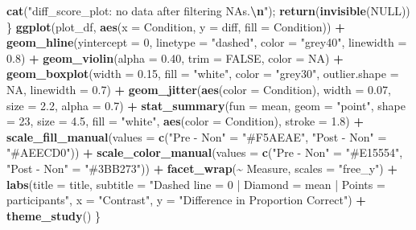 \documentclass[
]{article}
\newenvironment{Shaded}{\begin{snugshade}}{\end{snugshade}}
\newcommand{\AttributeTok}[1]{\textcolor[rgb]{0.13,0.29,0.53}{#1}}
\newcommand{\ConstantTok}[1]{\textcolor[rgb]{0.56,0.35,0.01}{#1}}
\newcommand{\DecValTok}[1]{\textcolor[rgb]{0.00,0.00,0.81}{#1}}
\newcommand{\FloatTok}[1]{\textcolor[rgb]{0.00,0.00,0.81}{#1}}
\newcommand{\FunctionTok}[1]{\textcolor[rgb]{0.13,0.29,0.53}{\textbf{#1}}}
\newcommand{\NormalTok}[1]{#1}
\newcommand{\OtherTok}[1]{\textcolor[rgb]{0.56,0.35,0.01}{#1}}
\newcommand{\SpecialCharTok}[1]{\textcolor[rgb]{0.81,0.36,0.00}{\textbf{#1}}}
\newcommand{\StringTok}[1]{\textcolor[rgb]{0.31,0.60,0.02}{#1}}
\begin{document}
\begin{Shaded}
\begin{Highlighting}[]
    \FunctionTok{cat}\NormalTok{(}\StringTok{"diff\_score\_plot: no data after filtering NAs.}\SpecialCharTok{\textbackslash{}n}\StringTok{"}\NormalTok{); }\FunctionTok{return}\NormalTok{(}\FunctionTok{invisible}\NormalTok{(}\ConstantTok{NULL}\NormalTok{))}
\NormalTok{  \}}
  \FunctionTok{ggplot}\NormalTok{(plot\_df, }\FunctionTok{aes}\NormalTok{(}\AttributeTok{x =}\NormalTok{ Condition, }\AttributeTok{y =}\NormalTok{ diff, }\AttributeTok{fill =}\NormalTok{ Condition)) }\SpecialCharTok{+}
    \FunctionTok{geom\_hline}\NormalTok{(}\AttributeTok{yintercept =} \DecValTok{0}\NormalTok{, }\AttributeTok{linetype =} \StringTok{"dashed"}\NormalTok{, }\AttributeTok{color =} \StringTok{"grey40"}\NormalTok{, }\AttributeTok{linewidth =} \FloatTok{0.8}\NormalTok{) }\SpecialCharTok{+}
    \FunctionTok{geom\_violin}\NormalTok{(}\AttributeTok{alpha =} \FloatTok{0.40}\NormalTok{, }\AttributeTok{trim =} \ConstantTok{FALSE}\NormalTok{, }\AttributeTok{color =} \ConstantTok{NA}\NormalTok{) }\SpecialCharTok{+}
    \FunctionTok{geom\_boxplot}\NormalTok{(}\AttributeTok{width =} \FloatTok{0.15}\NormalTok{, }\AttributeTok{fill =} \StringTok{"white"}\NormalTok{, }\AttributeTok{color =} \StringTok{"grey30"}\NormalTok{,}
                 \AttributeTok{outlier.shape =} \ConstantTok{NA}\NormalTok{, }\AttributeTok{linewidth =} \FloatTok{0.7}\NormalTok{) }\SpecialCharTok{+}
    \FunctionTok{geom\_jitter}\NormalTok{(}\FunctionTok{aes}\NormalTok{(}\AttributeTok{color =}\NormalTok{ Condition), }\AttributeTok{width =} \FloatTok{0.07}\NormalTok{, }\AttributeTok{size =} \FloatTok{2.2}\NormalTok{, }\AttributeTok{alpha =} \FloatTok{0.7}\NormalTok{) }\SpecialCharTok{+}
    \FunctionTok{stat\_summary}\NormalTok{(}\AttributeTok{fun =}\NormalTok{ mean, }\AttributeTok{geom =} \StringTok{"point"}\NormalTok{, }\AttributeTok{shape =} \DecValTok{23}\NormalTok{, }\AttributeTok{size =} \FloatTok{4.5}\NormalTok{,}
                 \AttributeTok{fill =} \StringTok{"white"}\NormalTok{, }\FunctionTok{aes}\NormalTok{(}\AttributeTok{color =}\NormalTok{ Condition), }\AttributeTok{stroke =} \FloatTok{1.8}\NormalTok{) }\SpecialCharTok{+}
    \FunctionTok{scale\_fill\_manual}\NormalTok{(}\AttributeTok{values  =} \FunctionTok{c}\NormalTok{(}\StringTok{"Pre {-} Non"} \OtherTok{=} \StringTok{"\#F5AEAE"}\NormalTok{, }\StringTok{"Post {-} Non"} \OtherTok{=} \StringTok{"\#AEECD0"}\NormalTok{)) }\SpecialCharTok{+}
    \FunctionTok{scale\_color\_manual}\NormalTok{(}\AttributeTok{values =} \FunctionTok{c}\NormalTok{(}\StringTok{"Pre {-} Non"} \OtherTok{=} \StringTok{"\#E15554"}\NormalTok{, }\StringTok{"Post {-} Non"} \OtherTok{=} \StringTok{"\#3BB273"}\NormalTok{)) }\SpecialCharTok{+}
    \FunctionTok{facet\_wrap}\NormalTok{(}\SpecialCharTok{\textasciitilde{}}\NormalTok{ Measure, }\AttributeTok{scales =} \StringTok{"free\_y"}\NormalTok{) }\SpecialCharTok{+}
    \FunctionTok{labs}\NormalTok{(}\AttributeTok{title    =}\NormalTok{ title,}
         \AttributeTok{subtitle =} \StringTok{"Dashed line = 0 | Diamond = mean | Points = participants"}\NormalTok{,}
         \AttributeTok{x =} \StringTok{"Contrast"}\NormalTok{, }\AttributeTok{y =} \StringTok{"Difference in Proportion Correct"}\NormalTok{) }\SpecialCharTok{+}
    \FunctionTok{theme\_study}\NormalTok{()}
\NormalTok{\}}


\end{Highlighting}
\end{Shaded}
\end{document}
